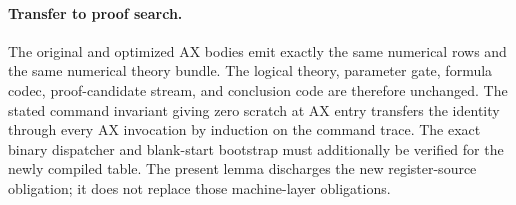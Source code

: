 \paragraph{Transfer to proof search.}
The original and optimized AX bodies emit exactly the same numerical rows
and the same numerical theory bundle.  The logical theory, parameter gate,
formula codec, proof-candidate stream, and conclusion code are therefore
unchanged.  The stated command invariant giving zero scratch at AX entry
transfers the identity through every AX invocation by induction on the
command trace.  The exact binary dispatcher and blank-start bootstrap
must additionally be verified for the newly compiled table.  The present
lemma discharges the new register-source obligation; it does not replace
those machine-layer obligations.
